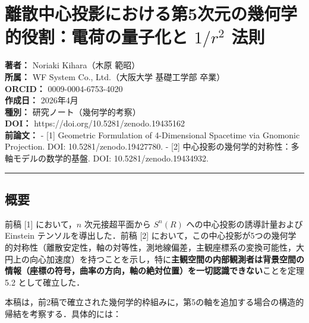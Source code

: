\documentclass[a4paper,11pt]{ltjsarticle}
\theoremstyle{definition}
\begin{document}
\section{\texorpdfstring{離散中心投影における第5次元の幾何学的役割：電荷の量子化と \(1/r^2\) 法則}{離散中心投影における第5次元の幾何学的役割：電荷の量子化と 1/r\^{}2 法則}}\label{ux96e2ux6563ux4e2dux5fc3ux6295ux5f71ux306bux304aux3051ux308bux7b2c5ux6b21ux5143ux306eux5e7eux4f55ux5b66ux7684ux5f79ux5272ux96fbux8377ux306eux91cfux5b50ux5316ux3068-1r2-ux6cd5ux5247}

\textbf{著者：} Noriaki Kihara（木原 範昭）\\
\textbf{所属：} WF System Co., Ltd.（大阪大学 基礎工学部 卒業）\\
\textbf{ORCID：} 0009-0004-6753-4020\\
\textbf{作成日：} 2026年4月\\
\textbf{種別：} 研究ノート（幾何学的考察）\\
\textbf{DOI：} https://doi.org/10.5281/zenodo.19435162\\
\textbf{前論文：} - {[}1{]} Geometric Formulation of 4-Dimensional Spacetime via Gnomonic Projection. DOI: 10.5281/zenodo.19427780. - {[}2{]} 中心投影の幾何学的対称性：多軸モデルの数学的基盤. DOI: 10.5281/zenodo.19434932.

\begin{center}\rule{0.5\linewidth}{0.5pt}\end{center}

\subsection{概要}\label{ux6982ux8981}

前稿 {[}1{]} において，\(n\) 次元接超平面から \(S^n(R)\) への中心投影の誘導計量および Einstein テンソルを導出した．前稿 {[}2{]} において，この中心投影が5つの幾何学的対称性（離散安定性，軸の対等性，測地線偏差，主観座標系の変換可能性，大円上の向心加速度）を持つことを示し，特に\textbf{主観空間の内部観測者は背景空間の情報（座標の符号，曲率の方向，軸の絶対位置）を一切認識できない}ことを定理 5.2 として確立した．

本稿は，前2稿で確立された幾何学的枠組みに，第5の軸を追加する場合の構造的帰結を考察する．具体的には：
\end{document}
